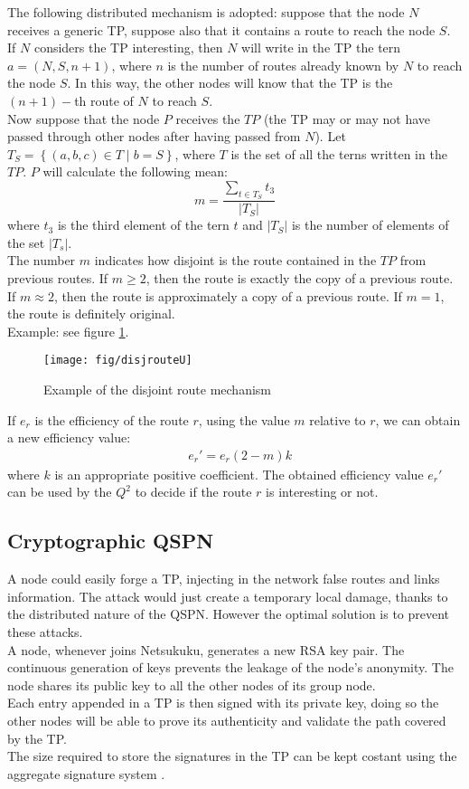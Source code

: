 \documentclass[a4paper]{article}
\newcommand{\pgra}[1]{\left\{#1\right\}}
\newcommand{\eal}[1]{{\begin{align*} #1 \end{align*}}}
\begin{document}
The following distributed mechanism is adopted: 
suppose that the node $N$ receives a generic TP, suppose also that it contains
a route to reach the node $S$. If $N$ considers the TP interesting, then 
$N$ will write in the TP the tern $a=(N,S,n+1)$, where
$n$ is the number of routes already known by $N$ to reach the node $S$. In
this way, the other nodes will know that the TP is the $(n+1)-$th route of $N$
to reach $S$.\\
Now suppose that the node $P$ receives the $TP$ (the TP may or may not have passed
through other nodes after having passed from $N$). Let $T_S=\pgra{
(a,b,c) \in T \;|\;b=S
}$, where $T$ is the set of all the terns written in the $TP$. $P$ will
calculate the following mean:
\[
m=\frac{\sum_{t \in T_S}^{}t_3}{|T_S|}
\]
where $t_3$ is the third element of the tern $t$ and $|T_S|$ is the number of elements of the set $|T_s|$.\\ 
The number $m$ indicates how disjoint is the route contained in the $TP$ from
previous routes. If $m\ge 2$, then the route is exactly the copy of a previous
route. If $m\approx 2$, then the route is approximately a copy of a previous
route. If $m=1$, the route is definitely original.\\
Example: see figure \ref{fig:disjroute}.\\
\begin{figure}[h]
	\begin{center}
		\texttt{[image: fig/disjrouteU]}
	\end{center}
	\caption{Example of the disjoint route mechanism}
	\label{fig:disjroute}
\end{figure}
If $e_r$ is the efficiency of the route $r$, using the value $m$ relative to
$r$, we can obtain a new efficiency value:
\eal{&e_r'=e_r(2-m)k}
where $k$ is an appropriate positive coefficient. 
The obtained efficiency value $e_r'$ can be used by the $Q^2$ to
decide if the route $r$ is interesting or not. 

\subsection{Cryptographic QSPN}
A node could easily forge a TP, injecting in the network false routes and
links information. The attack would just create a temporary local damage,
thanks to the distributed nature of the QSPN. However the optimal solution is
to prevent these attacks.\\

A node, whenever joins Netsukuku, generates a new RSA key pair. The
continuous generation of keys prevents the leakage of the node's anonymity.
The node shares its public key to all the other nodes of its group node.\\
Each entry appended in a TP is then signed with its private key, doing so the
other nodes will be able to prove its authenticity and validate the path
covered by the TP.\\
The size required to store the signatures in the TP can be kept costant using the
aggregate signature system \cite{aggrsign1} \cite{aggrsign2}.
\end{document}
